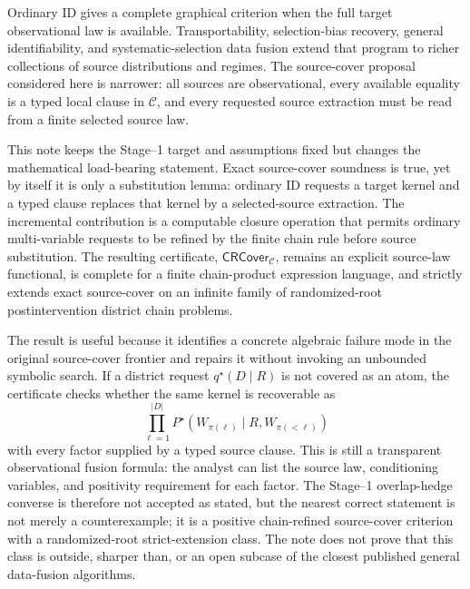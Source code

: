 \documentclass[11pt]{article}
\theoremstyle{definition}
\theoremstyle{plain}
\theoremstyle{remark}
\begin{document}
Ordinary ID gives a complete graphical criterion when the full target
observational law is available.  Transportability, selection-bias recovery,
general identifiability, and systematic-selection data fusion extend that
program to richer collections of source distributions and regimes.  The
source-cover proposal considered here is narrower: all sources are
observational, every available equality is a typed local clause in
\(\mathcal C\), and every requested source extraction must be read from a
finite selected source law.

This note keeps the Stage--1 target and assumptions fixed but changes the
mathematical load-bearing statement.  Exact source-cover soundness is true,
yet by itself it is only a substitution lemma: ordinary ID requests a target
kernel and a typed clause replaces that kernel by a selected-source
extraction.  The incremental contribution is a computable closure operation
that permits ordinary multi-variable requests to be refined by the finite chain
rule before source substitution.  The resulting certificate,
\(\mathsf{CRCover}_{\mathcal C}\), remains an explicit source-law functional,
is complete for a finite chain-product expression language, and strictly
extends exact source-cover on an infinite family of randomized-root
postintervention district chain problems.

The result is useful because it identifies a concrete algebraic failure mode
in the original source-cover frontier and repairs it without invoking an
unbounded symbolic search.  If a district request \(q^\star(D\mid R)\) is not
covered as an atom, the certificate checks whether the same kernel is
recoverable as
\[
  \prod_{\ell=1}^{|D|}
  P^\star(W_{\pi(\ell)}\mid R,W_{\pi(<\ell)})
\]
with every factor supplied by a typed source clause.  This is still a
transparent observational fusion formula: the analyst can list the source
law, conditioning variables, and positivity requirement for each factor.  The
Stage--1 overlap-hedge converse is therefore not accepted as stated, but the
nearest correct statement is not merely a counterexample; it is a positive
chain-refined source-cover criterion with a randomized-root strict-extension
class.  The note does not prove that this class is outside, sharper than, or
an open subcase of the closest published general data-fusion algorithms.
\end{document}

